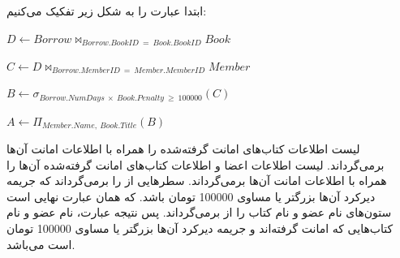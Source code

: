 \documentclass{article}
\begin{document}
\subsection{}
ابتدا عبارت را به شکل زیر تفکیک می‌کنیم:
\begin{center}
$
D
\leftarrow
Borrow
\bowtie_{Borrow.BookID\:=\:Book.BookID}
Book
$
\end{center}
\begin{center}
$
C
\leftarrow
D
\bowtie_{Borrow.MemberID\:=\:Member.MemberID}
Member
$
\end{center}
\begin{center}
$
B
\leftarrow
\sigma_{Borrow.NumDays\:\times\:Book.Penalty\:\geq\:100000}
(C)
$
\end{center}
\begin{center}
$
A
\leftarrow
\Pi_{Member.Name,\:Book.Title}
(B)
$
\end{center}
لیست اطلاعات کتاب‌های امانت گرفته‌شده را همراه با اطلاعات امانت آن‌ها برمی‌گرداند.
\newline
{}
لیست اطلاعات اعضا و اطلاعات کتاب‌های امانت گرفته‌شده آن‌ها را همراه با اطلاعات امانت آن‌ها برمی‌گرداند.
\newline
{}
سطر‌هایی از
را برمی‌گرداند که جریمه دیرکرد آن‌ها بزرگتر یا مساوی 100000 تومان باشد. 
\newline
{}
که همان عبارت نهایی است ستون‌های نام عضو و نام کتاب را از
برمی‌گرداند.
\newline
پس نتیجه عبارت، نام عضو و نام کتاب‌هایی که امانت گرفته‌اند و جریمه دیرکرد آن‌ها بزرگتر یا مساوی 100000 تومان است می‌باشد.
\end{document}
